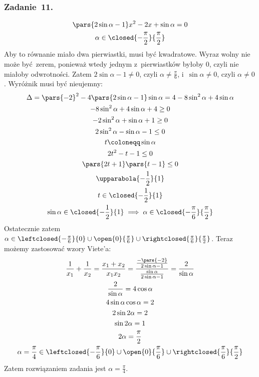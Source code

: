 \subsubsection*{Zadanie~11.}
\begin{gather*}
    \pars{2\sin\alpha - 1}x^2 - 2x + \sin\alpha = 0\\
    \alpha \in \closed{-\frac{\pi}{2}}{\frac{\pi}{2}}
\end{gather*}
Aby to równanie miało dwa pierwiastki, musi być kwadratowe. Wyraz wolny nie może być zerem, ponieważ wtedy jednym z~pierwiastków byłoby \(0\), czyli nie miałoby odwrotności. Zatem \(2\sin\alpha - 1 \neq 0\), czyli \(\alpha \neq \frac{\pi}{6}\), i~\(\sin\alpha \neq 0\), czyli \(\alpha \neq 0\). Wyróżnik musi być nieujemny:
\begin{gather*}
    \Delta
        = \pars{-2}^2 - 4\pars{2\sin\alpha - 1}\sin\alpha
        =  4 - 8\sin^2\alpha + 4\sin\alpha\\
    -8\sin^2\alpha + 4\sin\alpha + 4 \geq 0\\
    -2\sin^2\alpha + \sin\alpha + 1 \geq 0\\
    2\sin^2\alpha - \sin\alpha - 1 \leq 0\\
    t \coloneqq \sin\alpha\\
    2t^2 - t - 1 \leq 0\\
    \pars{2t + 1}\pars{t - 1} \leq 0\\
    \upparabola{-\frac{1}{2}}{1}\\
    t \in \closed{-\frac{1}{2}}{1}\\
    \sin\alpha \in \closed{-\frac{1}{2}}{1} \implies \alpha \in \closed{-\frac{\pi}{6}}{\frac{\pi}{2}}
\end{gather*}
Ostatecznie zatem \(\alpha \in \leftclosed{-\frac{\pi}{6}}{0} \cup \open{0}{\frac{\pi}{6}} \cup \rightclosed{\frac{\pi}{6}}{\frac{\pi}{2}}\). Teraz możemy zastosować wzory Viete'a:
\begin{gather*}
    \frac{1}{x_1} + \frac{1}{x_2} = \frac{x_1 + x_2}{x_1x_2} = \frac{\frac{-\pars{-2}}{2\sin\alpha - 1}}{\frac{\sin\alpha}{2\sin\alpha - 1}} = \frac{2}{\sin\alpha}\\
    \frac{2}{\sin\alpha} = 4\cos\alpha\\
    4\sin\alpha\cos\alpha = 2\\
    2\sin2\alpha = 2\\
    \sin2\alpha = 1\\
    2\alpha = \frac{\pi}{2}\\
    \alpha = \frac{\pi}{4} \in \leftclosed{-\frac{\pi}{6}}{0} \cup \open{0}{\frac{\pi}{6}} \cup \rightclosed{\frac{\pi}{6}}{\frac{\pi}{2}}
\end{gather*}
Zatem rozwiązaniem zadania jest \(\alpha = \frac{\pi}{4}\).
